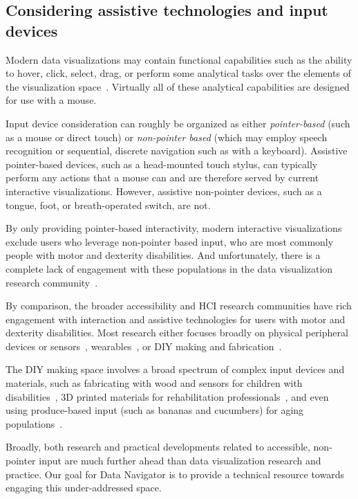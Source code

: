 \documentclass[12pt]{cmuthesis}
\begin{document}
\subsection{Considering assistive technologies and input devices}
Modern data visualizations may contain functional capabilities such as the ability to hover, click, select, drag, or perform some analytical tasks over the elements of the visualization space~\cite{Satyanarayan2017VegaLite}. Virtually all of these analytical capabilities are designed for use with a mouse.

Input device consideration can roughly be organized as either \textit{pointer-based} (such as a mouse or direct touch) or \textit{non-pointer based} (which may employ speech recognition or sequential, discrete navigation such as with a keyboard). Assistive pointer-based devices, such as a head-mounted touch stylus, can typically perform any actions that a mouse can and are therefore served by current interactive visualizations. However, assistive non-pointer devices, such as a tongue, foot, or breath-operated switch, are not.

By only providing pointer-based interactivity, modern interactive visualizations exclude users who leverage non-pointer based input, who are most commonly people with motor and dexterity disabilities. And unfortunately, there is a complete lack of engagement with these populations in the data visualization research community~\cite{Marriott}.

By comparison, the broader accessibility and HCI research communities have rich engagement with interaction and assistive technologies for users with motor and dexterity disabilities. Most research either focuses broadly on physical peripheral devices or sensors~\cite{Siean2021}, wearables~\cite{Sarsenbayeva2022}, or DIY making and fabrication~\cite{Hurst2013Making}.

The DIY making space involves a broad spectrum of complex input devices and materials, such as fabricating with wood and sensors for children with disabilities~\cite{Lin2014}, 3D printed materials for rehabilitation professionals~\cite{Giraud2016}, and even using produce-based input (such as bananas and cucumbers) for aging populations~\cite{Rogers2014}.

Broadly, both research and practical developments related to accessible, non-pointer input are much further ahead than data visualization research and practice. Our goal for Data Navigator is to provide a technical resource towards engaging this under-addressed space.
\end{document}
